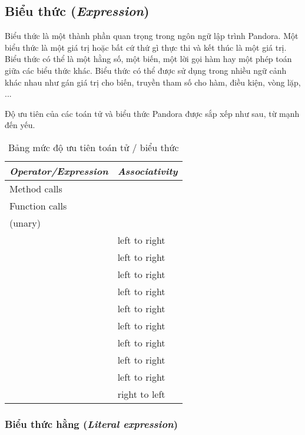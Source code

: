 \subsection{Biểu thức (\textit{Expression})}
\label{ch2:expr}
\regexexpr

Biểu thức là một thành phần quan trọng trong ngôn ngữ lập trình Pandora. Một biểu thức là một giá trị hoặc bất cứ thứ gì thực thi và kết thúc là một giá trị. Biểu thức có thể là một hằng số, một biến, một lời gọi hàm hay một phép toán giữa các biểu thức khác. Biểu thức có thể được sử dụng trong nhiều ngữ cảnh khác nhau như gán giá trị cho biến, truyền tham số cho hàm, điều kiện, vòng lặp, ...

Độ ưu tiên của các toán tử và biểu thức Pandora được sắp xếp như sau, từ mạnh đến yếu. 

\begin{longtable}{| l | l |}
    \caption{Bảng mức độ ưu tiên toán tử / biểu thức} \\
\hline
\textbf{\textit{Operator/Expression}} & \textbf{\textit{Associativity}} \\
\hline
Method calls & \\
\hline
Function calls & \\
\hline
\w{$-$}(unary) \w{$*$} \w{$!$} & \\
\hline
\w{$*$} \w{$/$} \w{$\%$} & left to right \\
\hline
\w{$+$} \w{$-$} & left to right \\
\hline
\w{$<<$} \w{$>>$} & left to right \\
\hline
\w{$\&$} & left to right \\
\hline
\w{$\wedge$} & left to right \\
\hline
\w{$|$} & left to right \\
\hline
\w{$==$} \w{$!=$} \w{$<$} \w{$>$} \w{$<=$} \w{$>=$} & left to right \\
\hline
\w{$\&\&$} & left to right \\
\hline
\w{$||$} & left to right \\
\hline
\w{$=$} \w{$+=$} \w{$-=$} \w{$*=$} \w{$/=$} \w{$\%=$} \w{$<<=$} \w{$>>=$} \w{$\&=$} \w{$\wedge=$} \w{$|=$} & right to left \\
\hline
\end{longtable}

\subsubsection{Biểu thức hằng (\textit{Literal expression})}

